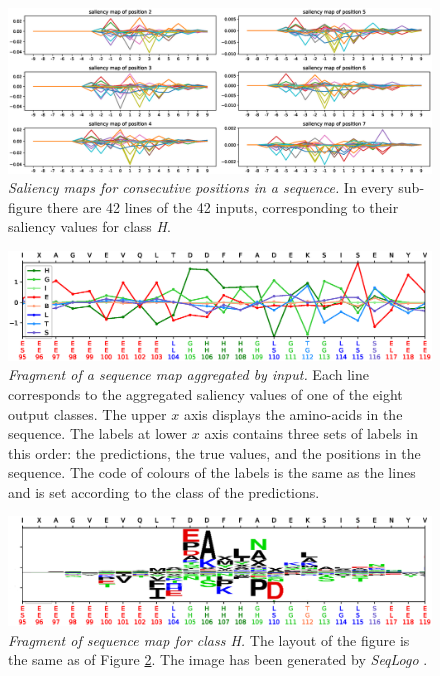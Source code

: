 	\begin{figure}
	\centering
	\includegraphics[width=1\linewidth]{Figures/sliding}
	\caption{\textit{Saliency maps for consecutive positions in a sequence.} In every sub-figure there are 42 lines of the 42 inputs, corresponding to their saliency values for class \textit{H}.}
	\label{fig:sliding}
	\end{figure}

	
	\begin{figure}
	\centering
	\includegraphics[width=1\linewidth]{Figures/sample_8classes}
	\caption{\textit{Fragment of a sequence map aggregated by input.} Each line corresponds to the aggregated saliency values of one of the eight output classes. The upper $x$ axis displays the amino-acids in the sequence. The labels at lower $x$ axis contains three sets of labels in this order: the predictions, the true values, and the positions in the sequence. The code of colours of the labels is the same as the lines and is set according to the class of the predictions.}
	\label{fig:sample_8classes}
	\end{figure}
	
	\begin{figure}
	\centering
	\includegraphics[width=1\linewidth]{Figures/sample_Hclass}
	\caption{\textit{Fragment of sequence map for class H.} The layout of the figure is the same as of Figure \ref{fig:sample_8classes}. The image has been generated by \textit{SeqLogo} \cite{Thomsen2012}.}
	\label{fig:sample_Hclass}
	\end{figure}

